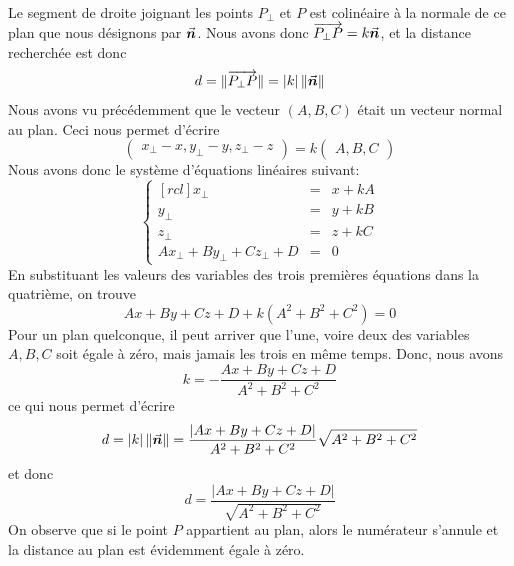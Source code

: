 Le segment de droite joignant les points $P_\perp$ et $P$ est colinéaire à la normale
de ce plan que nous désignons par $\vec{\boldsymbol{n}}$.  Nous avons donc $\overrightarrow{P_\perp P} = k \vec{\boldsymbol{n}}$, et
la distance recherchée est donc
\[
d = \lVert\overrightarrow{P_\perp P}\rVert = |k|\, \lVert\vec{\boldsymbol{n}}\rVert
\]
Nous avons vu précédemment que le vecteur $(A, B, C)$ était un vecteur normal au plan.
Ceci nous permet d'écrire
\[
\begin{pmatrix}
x_\perp-x, 
 y_\perp-y, 
 z_\perp-z
\end{pmatrix}
= k \begin{pmatrix}
A, B , C
\end{pmatrix}
\]
Nous avons donc le système d'équations linéaires suivant:
\[
\left\{
\begin{matrix}[rcl]
x_\perp &=& x + kA \\
y_\perp &=& y + kB \\
z_\perp &=& z + kC \\
Ax_\perp + By_\perp + Cz_\perp + D &=& 0
\end{matrix}
\right.
\]
En substituant les valeurs des variables des trois premières équations dans la quatrième, on trouve
\[
Ax + By + Cz + D + k( A^2 + B^2 + C^2 ) = 0
\]
Pour un plan quelconque, il peut arriver que l'une, voire deux des
variables $A, B, C$ soit égale à zéro, mais jamais les trois
en même temps. Donc, nous avons
\[
k = -\frac{Ax + By + Cz + D}{A^2 + B^2 + C^2}
\]
ce qui nous permet d'écrire
\[
d =  |k|\, \lVert\vec{\boldsymbol{n}}\rVert = \frac{|Ax + By + Cz + D|}{A^2 + B^2 + C^2} \sqrt{A^2 + B^2 + C^2}
\]
et donc
\[
d = \frac{|Ax + By + Cz + D|}{\sqrt{A^2 + B^2 + C^2}} 
\]
On observe que si le point $P$ appartient au plan, alors le numérateur s'annule et la distance
au plan est évidemment égale à zéro. 

